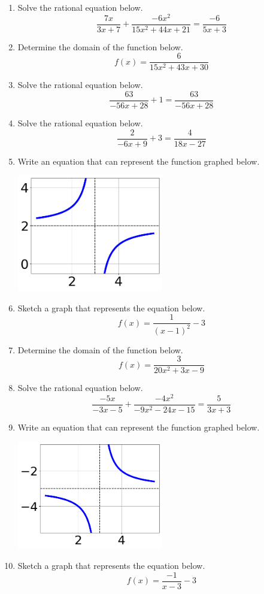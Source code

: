 \documentclass[14pt]{extbook}
\begin{document}
\begin{enumerate}
\item{
Solve the rational equation below.\[ \frac{7x}{3x + 7} + \frac{-6x^{2}}{15x^{2} +44 x + 21} = \frac{-6}{5x + 3} \]} \newpage
\item{
Determine the domain of the function below.\[ f(x) = \frac{6}{15x^{2} +43 x + 30} \]} \newpage
\item{
Solve the rational equation below.\[ \frac{63}{-56x + 28} + 1 = \frac{63}{-56x + 28} \]} \newpage
\item{
Solve the rational equation below.\[ \frac{2}{-6x + 9} + 3 = \frac{4}{18x -27} \]} \newpage
\item{
Write an equation that can represent the function graphed below.
\begin{center}
    \includegraphics[width=0.5\textwidth]{../Figures/rationalGraphToEquationC.png}
\end{center}
} \newpage
\item{
Sketch a graph that represents the equation below.\[ f(x) = \frac{1}{(x - 1)^2} - 3 \]} \newpage
\item{
Determine the domain of the function below.\[ f(x) = \frac{3}{20x^{2} +3 x -9} \]} \newpage
\item{
Solve the rational equation below.\[ \frac{-5x}{-3x -5} + \frac{-4x^{2}}{-9x^{2} -24 x -15} = \frac{5}{3x + 3} \]} \newpage
\item{
Write an equation that can represent the function graphed below.
\begin{center}
    \includegraphics[width=0.5\textwidth]{../Figures/rationalGraphToEquationCopyC.png}
\end{center}
} \newpage
\item{
Sketch a graph that represents the equation below.\[ f(x) = \frac{-1}{x - 3} - 3 \]} \newpage
\end{enumerate}
\end{document}
